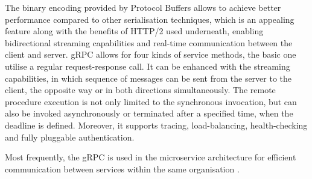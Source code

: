 The binary encoding provided by Protocol Buffers allows to achieve better performance compared to other serialisation techniques, which is an appealing feature along with the benefits of HTTP/2 used underneath, enabling bidirectional streaming capabilities and real-time communication between the client and server.
gRPC allows for four kinds of service methods, the basic one utilise a regular request-response call. It can be enhanced with the streaming capabilities, in which sequence of messages can be sent from the server to the client, the opposite way or in both directions simultaneously.
The remote procedure execution is not only limited to the synchronous invocation, but can also be invoked asynchronously or terminated after a specified time, when the deadline is defined. Moreover, it supports tracing, load-balancing, health-checking and fully pluggable authentication.

Most frequently, the gRPC is used in the microservice architecture for efficient communication between services within the same organisation \cite{DesignDataIntensiveApplications}.








